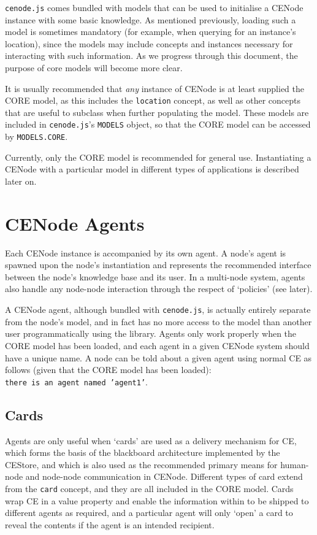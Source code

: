 \documentclass{scrartcl}
\begin{document}
\texttt{cenode.js} comes bundled with models that can be used to initialise a CENode instance with some basic knowledge. As mentioned previously, loading such a model is sometimes mandatory (for example, when querying for an instance's location), since the models may include concepts and instances necessary for interacting with such information. As we progress through this document, the purpose of core models will become more clear.

It is usually recommended that \textit{any} instance of CENode is at least supplied the CORE model, as this includes the \texttt{location} concept, as well as other concepts that are useful to subclass when further populating the model. These models are included in \texttt{cenode.js}'s \texttt{MODELS} object, so that the CORE model can be accessed by \texttt{MODELS.CORE}. 

Currently, only the CORE model is recommended for general use. Instantiating a CENode with a particular model in different types of applications is described later on.



\section{CENode Agents}
Each CENode instance is accompanied by its own agent. A node's agent is spawned upon the node's instantiation and represents the recommended interface between the node's knowledge base and its user. In a multi-node system, agents also handle any node-node interaction through the respect of `policies' (see later).

A CENode agent, although bundled with \texttt{cenode.js}, is actually entirely separate from the node's model, and in fact has no more access to the model than another user programmatically using the library. Agents only work properly when the CORE model has been loaded, and each agent in a given CENode system should have a unique name. A node can be told about a given agent using normal CE as follows (given that the CORE model has been loaded):\\
\texttt{there is an agent named 'agent1'}.

\subsection{Cards}

Agents are only useful when `cards' are used as a delivery mechanism for CE, which forms the basis of the blackboard architecture implemented by the CEStore, and which is also used as the recommended primary means for human-node and node-node communication in CENode. Different types of card extend from the \texttt{card} concept, and they are all included in the CORE model. Cards wrap CE in a value property and enable the information within to be shipped to different agents as required, and a particular agent will only `open' a card to reveal the contents if the agent is an intended recipient. \\
\end{document}

